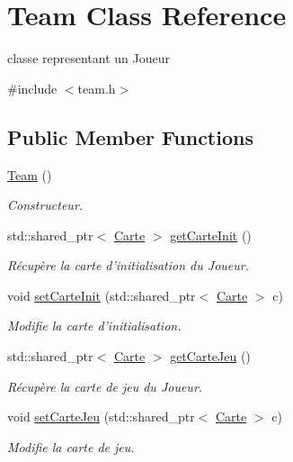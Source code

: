 \hypertarget{classTeam}{\section{Team Class Reference}
\label{classTeam}
}


classe representant un Joueur  




{\ttfamily \#include $<$team.\+h$>$}

\subsection*{Public Member Functions}
\begin{DoxyCompactItemize}
\item 
\hyperlink{classTeam_aada295895b747960576b69d8c87a54ba}{Team} ()
\begin{DoxyCompactList}\small\item\em Constructeur. \end{DoxyCompactList}\item 
std\+::shared\+\_\+ptr$<$ \hyperlink{classCarte}{Carte} $>$ \hyperlink{classTeam_a8437fa1637e3a4669a676035e9d2fa56}{get\+Carte\+Init} ()
\begin{DoxyCompactList}\small\item\em Récupère la carte d'initialisation du Joueur. \end{DoxyCompactList}\item 
void \hyperlink{classTeam_a3af475d5b149db7883694bed764ddf04}{set\+Carte\+Init} (std\+::shared\+\_\+ptr$<$ \hyperlink{classCarte}{Carte} $>$ c)
\begin{DoxyCompactList}\small\item\em Modifie la carte d'initialisation. \end{DoxyCompactList}\item 
std\+::shared\+\_\+ptr$<$ \hyperlink{classCarte}{Carte} $>$ \hyperlink{classTeam_a25cc34febbd1876085272a62ce96fb2c}{get\+Carte\+Jeu} ()
\begin{DoxyCompactList}\small\item\em Récupère la carte de jeu du Joueur. \end{DoxyCompactList}\item 
void \hyperlink{classTeam_a0786a89ae3fd8fc20d327ddd3e07b2cf}{set\+Carte\+Jeu} (std\+::shared\+\_\+ptr$<$ \hyperlink{classCarte}{Carte} $>$ c)
\begin{DoxyCompactList}\small\item\em Modifie la carte de jeu. \end{DoxyCompactList}\item 

\end{DoxyCompactItemize}
